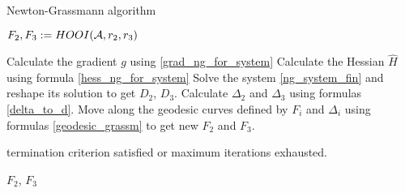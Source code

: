\begin{algorithm}
\caption{Newton-Grassmann algorithm}\label{newgr_algo}
\begin{algorithmic}[1]

\State $F_2,F_3 := HOOI(\mathcal{A}, r_2, r_3) $ 
\Repeat 

\State Calculate the gradient $g$ using \ref{grad_ng_for_system}
\State Calculate the Hessian $\hat{H}$ using formula \ref{hess_ng_for_system}
\State Solve the system \ref{ng_system_fin} and reshape its solution to get $D_2$, $D_3$.
\State Calculate $\Delta_2$ and $\Delta_3$ using formulas \ref{delta_to_d}.
\State Move along the geodesic curves defined by $F_i$ and $\Delta_i$ using formulas
\ref{geodesic_grassm} to get new $F_2$ and $F_3$.
    
\Until termination criterion satisfied or maximum iterations exhausted.


\State \Return $F_2$, $F_3$


\EndFunction
\end{algorithmic}
\end{algorithm}



